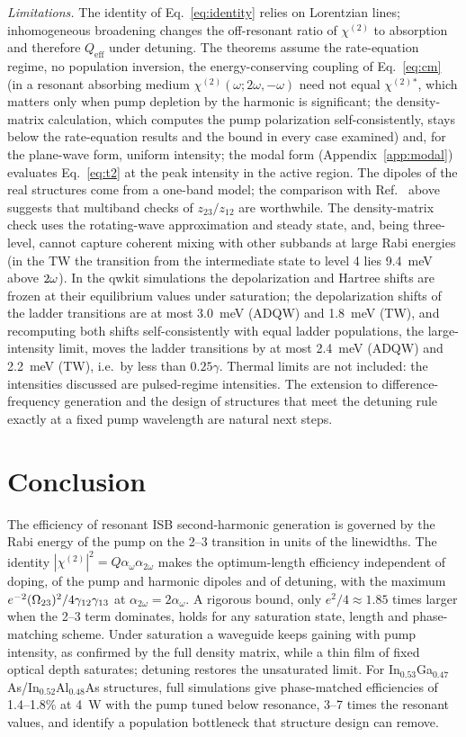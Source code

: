 \documentclass[11pt]{article}
\newcommand{\chitwo}{\chi^{(2)}}
\newcommand{\aw}{\alpha_{\omega}}
\newcommand{\aww}{\alpha_{2\omega}}
\let\hbar\relax\DeclareRobustCommand{\hbar}{{\mathchar'26\mkern-9mu h}}
\begin{document}
\emph{Limitations.} The identity of Eq.~\eqref{eq:identity} relies on Lorentzian lines; inhomogeneous broadening changes the off-resonant ratio of $\chitwo$ to absorption and therefore $Q_\mathrm{eff}$ under detuning. The theorems assume the rate-equation regime, no population inversion, the energy-conserving coupling of Eq.~\eqref{eq:cm} (in a resonant absorbing medium $\chi^{(2)}(\omega;2\omega,-\omega)$ need not equal $\chitwo{}^*$, which matters only when pump depletion by the harmonic is significant; the density-matrix calculation, which computes the pump polarization self-consistently, stays below the rate-equation results and the bound in every case examined) and, for the plane-wave form, uniform intensity; the modal form (Appendix~\ref{app:modal}) evaluates Eq.~\eqref{eq:t2} at the peak intensity in the active region. The dipoles of the real structures come from a one-band model; the comparison with Ref.~\cite{Vurgaftman1996} above suggests that multiband checks of $z_{23}/z_{12}$ are worthwhile. The density-matrix check uses the rotating-wave approximation and steady state, and, being three-level, cannot capture coherent mixing with other subbands at large Rabi energies (in the TW the transition from the intermediate state to level 4 lies 9.4~meV above $2\hbar\omega$). In the qwkit simulations the depolarization and Hartree shifts are frozen at their equilibrium values under saturation; the depolarization shifts of the ladder transitions are at most 3.0~meV (ADQW) and 1.8~meV (TW), and recomputing both shifts self-consistently with equal ladder populations, the large-intensity limit, moves the ladder transitions by at most 2.4~meV (ADQW) and 2.2~meV (TW), i.e.\ by less than $0.25\gamma$. Thermal limits are not included: the intensities discussed are pulsed-regime intensities. The extension to difference-frequency generation and the design of structures that meet the detuning rule exactly at a fixed pump wavelength are natural next steps.

\section{Conclusion}
The efficiency of resonant ISB second-harmonic generation is governed by the Rabi energy of the pump on the 2--3 transition in units of the linewidths. The identity $|\chitwo|^2=Q\aw\aww$ makes the optimum-length efficiency independent of doping, of the pump and harmonic dipoles and of detuning, with the maximum $e^{-2}(\hbar\Omega_{23})^2/4\gamma_{12}\gamma_{13}$ at $\aww=2\aw$. A rigorous bound, only $e^2/4\approx1.85$ times larger when the 2--3 term dominates, holds for any saturation state, length and phase-matching scheme. Under saturation a waveguide keeps gaining with pump intensity, as confirmed by the full density matrix, while a thin film of fixed optical depth saturates; detuning restores the unsaturated limit. For In$_{0.53}$Ga$_{0.47}$As/In$_{0.52}$Al$_{0.48}$As structures, full simulations give phase-matched efficiencies of 1.4--1.8\% at 4~W with the pump tuned below resonance, 3--7 times the resonant values, and identify a population bottleneck that structure design can remove.
\end{document}
